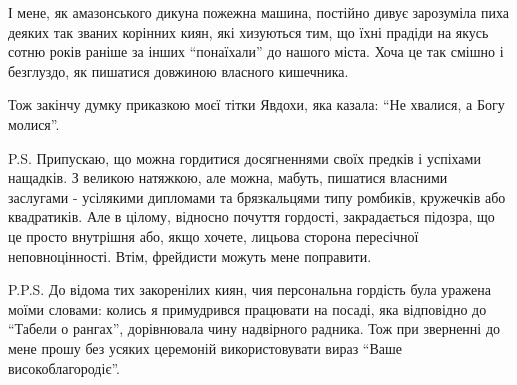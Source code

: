 І мене, як амазонського дикуна пожежна машина,  постійно дивує зарозуміла пиха
деяких так званих корінних киян, які хизуються  тим, що їхні прадіди на якусь
сотню років раніше за інших \enquote{понаїхали} до нашого міста. Хоча це так смішно і
безглуздо, як пишатися довжиною власного кишечника.

Тож закінчу думку  приказкою моєї тітки Явдохи, яка казала: \enquote{Не хвалися, а Богу
молися}.

P.S. Припускаю, що можна гордитися досягненнями своїх предків і успіхами
нащадків. З великою натяжкою,  але можна, мабуть, пишатися  власними заслугами
- усілякими дипломами та брязкальцями типу ромбиків, кружечків або квадратиків.
Але в цілому, відносно почуття гордості,  закрадається підозра, що це просто
внутрішня або, якщо хочете, лицьова сторона пересічної неповноцінності. Втім,
фрейдисти можуть мене поправити.

P.P.S. До відома тих закоренілих киян, чия персональна гордість була уражена
моїми словами: колись я примудрився працювати на посаді, яка відповідно до
\enquote{Табели о рангах},  дорівнювала  чину надвірного радника. Тож при зверненні до
мене прошу без усяких церемоній використовувати вираз \enquote{Ваше високоблагородіє}.

